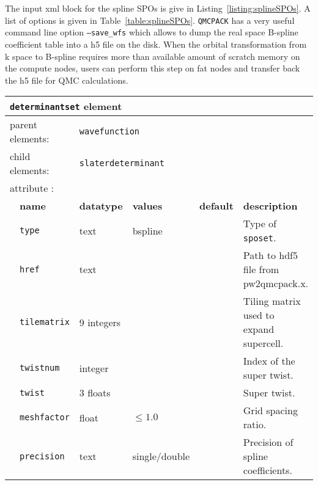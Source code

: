 The input xml block for the spline SPOs is give in Listing~\ref{listing:splineSPOs}. A list of options is given in 
Table~\ref{table:splineSPOs}. \texttt{QMCPACK} has a very useful command line option \texttt{--save\_wfs} which allows to dump 
the real space B-spline coefficient table into a h5 file on the disk.
When the orbital transformation from k space to B-spline requires more than available amount of scratch memory on the compute nodes, 
users can perform this step on fat nodes and transfer back the h5 file for QMC calculations.

\begin{table}[h]
\begin{center}
\begin{tabularx}{\textwidth}{l l l l l X }
\hline
\multicolumn{6}{l}{\texttt{determinantset} element} \\
\hline
\multicolumn{2}{l}{parent elements:} & \multicolumn{4}{l}{\texttt{wavefunction}}\\
\multicolumn{2}{l}{child  elements:} & \multicolumn{4}{l}{\texttt{slaterdeterminant}}\\
\multicolumn{2}{l}{attribute      :} & \multicolumn{4}{l}{}\\
   &   \bfseries name                   & \bfseries datatype & \bfseries values & \bfseries default & \bfseries description \\
   &   \texttt{type}                    &  text              &   bspline        &                   &  Type of \texttt{sposet}. \\
   &   \texttt{href}                    &  text              &                  &                   &  Path to hdf5 file from pw2qmcpack.x. \\
   &   \texttt{tilematrix}              &  9 integers        &                  &                   &  Tiling matrix used to expand supercell. \\
   &   \texttt{twistnum}                &  integer           &                  &                   &  Index of the super twist. \\
   &   \texttt{twist}                   &  3 floats          &                  &                   &  Super twist. \\
   &   \texttt{meshfactor}              &  float             &  $\le 1.0$       &                   &  Grid spacing ratio. \\
   &   \texttt{precision}               &  text              &  single/double   &                   &  Precision of spline coefficients. \\

\end{tabularx}
\end{center}
\end{table}
